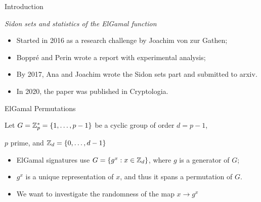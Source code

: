 
\begin{frame}{Introduction}
    \begin{center}
        \emph{Sidon sets and statistics of the ElGamal function} \\
        \citet*{boppre2020sidon}
    \end{center}
    
    \begin{itemize}
        \item Started in 2016 as a research challenge by Joachim von zur Gathen;
        \item Boppré and Perin wrote a report with experimental analysis;
        \item By 2017, Ana and Joachim wrote the Sidon sets part and submitted to arxiv.
        \item In 2020, the paper was published in Cryptologia.
    \end{itemize}
\end{frame}


\begin{frame}{ElGamal Permutations}

    Let $ G = \mathbb{Z}_p^* = \{1, \ldots, p-1\}$ be a cyclic group of order $d =p-1$,
    
    $p$ prime, and $\mathbb{Z}_d = \{0, \ldots, d-1\}$
    \vspace{10pt}
    
    \pause
    \begin{itemize}
        \item ElGamal signatures use $G = \{ g^x : x\in \mathbb{Z}_d\}$, where $g$ is a generator of $G$;
        \item $g^x$ is a unique representation of $x$, and thus it spans a permutation of $G$.
        \item We want to investigate the randomness of the map $x \to g^x$
    \end{itemize}
    
\end{frame}


